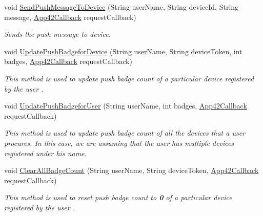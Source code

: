 \begin{DoxyCompactItemize}
\item 
void \hyperlink{classcom_1_1shephertz_1_1app42_1_1paas_1_1sdk_1_1windows_1_1push_1_1_push_notification_service_a999cdc388fbe69e05639f71ca1164bb8}{Send\+Push\+Message\+To\+Device} (String user\+Name, String device\+Id, String message, \hyperlink{interfacecom_1_1shephertz_1_1app42_1_1paas_1_1sdk_1_1windows_1_1_app42_callback}{App42\+Callback} request\+Callback)
\begin{DoxyCompactList}\small\item\em Sends the push message to device. \end{DoxyCompactList}\item 
void \hyperlink{classcom_1_1shephertz_1_1app42_1_1paas_1_1sdk_1_1windows_1_1push_1_1_push_notification_service_a759577fc5dd3bc0cd9ca143fa4dc2eb6}{Update\+Push\+Badgefor\+Device} (String user\+Name, String device\+Token, int badges, \hyperlink{interfacecom_1_1shephertz_1_1app42_1_1paas_1_1sdk_1_1windows_1_1_app42_callback}{App42\+Callback} request\+Callback)
\begin{DoxyCompactList}\small\item\em This method is used to update push badge count of a particular device registered by the user . \end{DoxyCompactList}\item 
void \hyperlink{classcom_1_1shephertz_1_1app42_1_1paas_1_1sdk_1_1windows_1_1push_1_1_push_notification_service_a6ee83dd28f692a5671d2f1fc202a7f12}{Update\+Push\+Badgefor\+User} (String user\+Name, int badges, \hyperlink{interfacecom_1_1shephertz_1_1app42_1_1paas_1_1sdk_1_1windows_1_1_app42_callback}{App42\+Callback} request\+Callback)
\begin{DoxyCompactList}\small\item\em This method is used to update push badge count of all the devices that a user procures. In this case, we are assuming that the user has multiple devices registered under his name. \end{DoxyCompactList}\item 
void \hyperlink{classcom_1_1shephertz_1_1app42_1_1paas_1_1sdk_1_1windows_1_1push_1_1_push_notification_service_af7f8f5e4bc60efd7586b5053c91a7eda}{Clear\+All\+Badge\+Count} (String user\+Name, String device\+Token, \hyperlink{interfacecom_1_1shephertz_1_1app42_1_1paas_1_1sdk_1_1windows_1_1_app42_callback}{App42\+Callback} request\+Callback)
\begin{DoxyCompactList}\small\item\em This method is used to reset push badge count to {\bfseries 0} of a particular device registered by the user . \end{DoxyCompactList}\item 

\end{DoxyCompactItemize}
